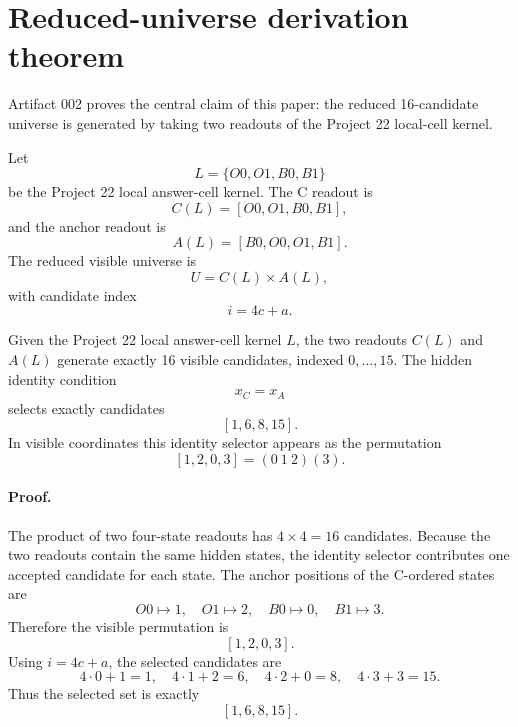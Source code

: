 \section{Reduced-universe derivation theorem}

Artifact 002 proves the central claim of this paper: the reduced 16-candidate universe is generated by taking two readouts of the Project 22 local-cell kernel.

Let
\[
    L=\{O0,O1,B0,B1\}
\]
be the Project 22 local answer-cell kernel.  The C readout is
\[
    C(L)=[O0,O1,B0,B1],
\]
and the anchor readout is
\[
    A(L)=[B0,O0,O1,B1].
\]
The reduced visible universe is
\[
    U=C(L)\times A(L),
\]
with candidate index
\[
    i=4c+a.
\]

\begin{theorem}
Given the Project 22 local answer-cell kernel \(L\), the two readouts \(C(L)\) and \(A(L)\) generate exactly 16 visible candidates, indexed \(0,\ldots,15\).  The hidden identity condition
\[
    x_C=x_A
\]
selects exactly candidates
\[
    [1,6,8,15].
\]
In visible coordinates this identity selector appears as the permutation
\[
    [1,2,0,3]=(0\ 1\ 2)(3).
\]
\end{theorem}

\paragraph{Proof.}
The product of two four-state readouts has \(4\times4=16\) candidates.  Because the two readouts contain the same hidden states, the identity selector contributes one accepted candidate for each state.  The anchor positions of the C-ordered states are
\[
    O0\mapsto 1,\quad
    O1\mapsto 2,\quad
    B0\mapsto 0,\quad
    B1\mapsto 3.
\]
Therefore the visible permutation is
\[
    [1,2,0,3].
\]
Using \(i=4c+a\), the selected candidates are
\[
    4\cdot0+1=1,\quad
    4\cdot1+2=6,\quad
    4\cdot2+0=8,\quad
    4\cdot3+3=15.
\]
Thus the selected set is exactly
\[
    [1,6,8,15].
\]

